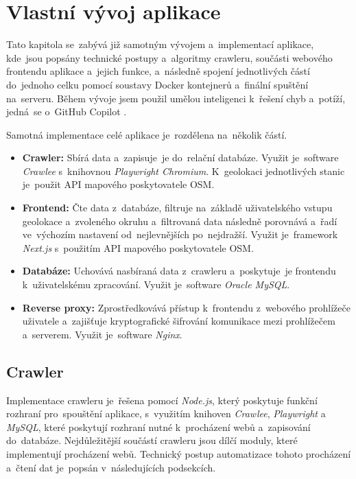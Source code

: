 \chapter{Vlastní vývoj aplikace}
\label{ch:development}

Tato kapitola se~zabývá již samotným vývojem a~implementací aplikace,
kde~jsou popsány technické postupy a~algoritmy crawleru, součásti
webového frontendu aplikace a~jejich funkce, a~následně spojení jednotlivých
částí do~jednoho celku pomocí soustavy Docker kontejnerů a~finální spuštění
na~serveru. Během vývoje jsem použil umělou inteligenci k~řešení chyb
a~potíží, jedná~se o~GitHub Copilot \cite{shCgjU2g2YA0ff8T}. %

Samotná implementace celé aplikace je~rozdělena na~několik částí.

\begin{itemize}
    \item \textbf{Crawler:} Sbírá data a~zapisuje~je do~relační databáze.
        Využit je~software \emph{Crawlee} s~knihovnou \emph{Playwright
        Chromium}. K~geolokaci jednotlivých stanic je~použit API mapového
        poskytovatele OSM.
    \item \textbf{Frontend:} Čte data z~databáze, filtruje na~základě
        uživatelského vstupu geolokace a~zvoleného okruhu a~filtrovaná
        data následně porovnává a~řadí ve~výchozím nastavení od~nejlevnějších
        po~nejdražší. Využit je~framework \emph{Next.js} s~použitím API
        mapového poskytovatele OSM.
    \item \textbf{Databáze:} Uchovává nasbíraná data z~crawleru a~poskytuje~je
        frontendu k~uživatelskému zpracování. Využit je~software
        \emph{Oracle MySQL}.
    \item \textbf{Reverse proxy:} Zprostředkovává přístup k~frontendu
        z~webového prohlížeče uživatele a~zajišťuje kryptografické
        šifrování komunikace mezi prohlížečem a~serverem. Využit je~software
        \emph{Nginx}.
\end{itemize}

\section{Crawler}
\label{sec:development-crawler}

Implementace crawleru je~řešena pomocí \emph{Node.js}, který poskytuje funkční
rozhraní pro~spouštění aplikace, s~využitím knihoven \emph{Crawlee},
\emph{Playwright} a \emph{MySQL}, které poskytují rozhraní nutné k~procházení
webů a~zapisování do~databáze. Nejdůležitější součástí crawleru jsou dílčí
moduly, které implementují procházení webů. Technický postup automatizace
tohoto procházení a~čtení dat je~popsán v~následujících podsekcích.

